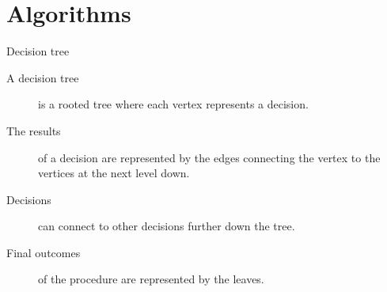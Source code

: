 
\section{Algorithms}

\begin{frame}{Decision tree}
  \begin{description}
    \item[A decision tree] is a rooted tree where each vertex represents a decision.
    \vspace{4mm}
    \item[The results] of a decision are represented by the edges connecting the vertex to the vertices at the next level down.
    \vspace{4mm}
    \item[Decisions] can connect to other decisions further down the tree.
    \vspace{4mm}
    \item[Final outcomes] of the procedure are represented by the leaves.
  \end{description}
\end{frame}


